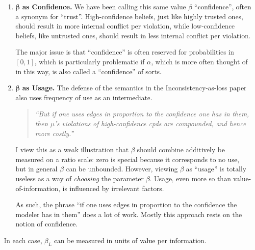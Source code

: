 \documentclass[twoside]{article} %
\theoremstyle{plain}
\theoremstyle{definition}
\newcommand{\bbeta}{\boldsymbol\beta}
\begin{document}
\begin{enumerate}
        \item $\bbeta$ \textbf{as Confidence.}
        We have been calling this same value $\beta$ ``confidence'', often a synonym for ``trust''.
        High-confidence beliefs, just like highly trusted ones, should result in more internal conflict per violation, while low-confidence beliefs, like untrusted ones, should result in less internal conflict per violation.

        The major issue is that  ``confidence'' is often reserved for probabilities in $[0,1]$, which is particularly problematic if $\alpha$, which is more often thought of in this way, is also called a ``confidence'' of sorts.

        \item $\bbeta$ \textbf{as Usage.}
        The defense of the semantics in the Inconsistency-as-loss paper also uses frequency of use as an intermediate.
        \begin{quote}\it
            ``But if one uses edges in proportion to the confidence one has in
            them, then $\mu$'s violations of high-confidence cpds are compounded,
            and hence more costly.''
        \end{quote}
        I view this as a weak illustration that $\beta$ should combine additively be measured on a ratio scale: zero is special because it corresponds to no use, but in general $\beta$ can be unbounded.
        However, viewing $\beta$ as ``usage'' is totally useless as a way of \emph{choosing} the parameter $\beta$. Usage, even more so than value-of-information, is influenced by irrelevant factors.

        As such, the phrase ``if one uses edges in proportion to the confidence the modeler has in them'' does a lot of work. Mostly this approach rests on the notion of confidence.
    \end{enumerate}
    \smallskip

    \noindent In each case, $\beta_L$ can be measured in units of
    value per information.
\end{document}
